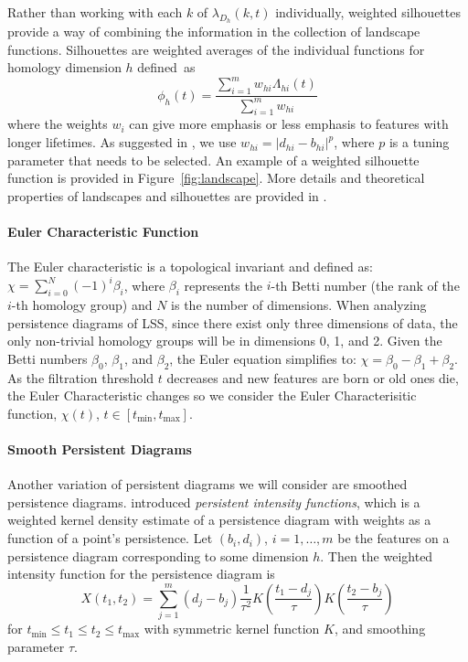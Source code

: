 \documentclass[12pt]{article}
\begin{document}
Rather than working with each $k$ of $\lambda_{D_h}(k, t)$ individually, weighted silhouettes provide a way of combining the information in the collection of landscape functions. Silhouettes are weighted averages of the individual functions for homology dimension $h$ defined~as
%
\begin{equation*}
\phi_h(t) = \frac{\sum_{i = 1}^mw_{hi}\Lambda_{hi}(t)}{\sum_{i = 1}^mw_{hi}}
\end{equation*}
where the weights $w_i$ can give more emphasis or less emphasis to features with longer lifetimes. As suggested in \citep{chazal2014stochastic}, we use $w_{hi} = |d_{hi} - b_{hi}|^p$, where $p$ is a tuning parameter that needs to be selected.  An example of a weighted silhouette function is provided in Figure~\ref{fig:landscape}.
More details and theoretical properties of landscapes and silhouettes are provided in \citep{chazal2014stochastic}.

\paragraph{Euler Characteristic Function}
The Euler characteristic is a topological invariant and defined as: $\chi = \sum_{i=0}^{N} (-1)^{i} \beta_{i}$,
where $\beta_{i}$ represents the $i$-th Betti number (the rank of the $i$-th homology group) and $N$ is the number of dimensions. When analyzing persistence diagrams of LSS, since there exist only three dimensions of data, the only non-trivial homology groups will be in dimensions 0, 1, and 2. Given the Betti numbers $\beta_{0}$, $\beta_{1}$, and $\beta_{2}$, the Euler equation simplifies to:
$\chi = \beta_{0} - \beta_{1} + \beta_{2}.$
As the filtration threshold $t$ decreases and new features are born or old ones die, the Euler Characteristic changes so we consider the Euler Characterisitic function, $\chi(t)$, $t \in [t_{\min}, t_{\max}]$.




\paragraph{Smooth Persistent Diagrams}
Another variation of persistent diagrams we will consider are smoothed persistence diagrams. \cite{chen2015statistical} introduced \emph{persistent intensity functions}, which is a weighted kernel density estimate of a persistence diagram with weights as a function of a point's persistence. Let $(b_i, d_i)$, $i = 1, \ldots, m$ be the features on a persistence diagram corresponding to some dimension $h$. Then the weighted intensity function for the persistence diagram is
%
\[ X(t_1, t_2) = \sum_{j=1}^m(d_{j} - b_{j})\frac{1}{\tau^{2}}K \left(\frac{t_1-d_{j}}{\tau}\right)K \left(\frac{t_2-b_{j}}{\tau}\right)\]
%
for $t_{\min} \leq t_1 \leq t_2 \leq t_{\max}$ with symmetric kernel function $K$, and smoothing parameter $\tau$.
\end{document}
